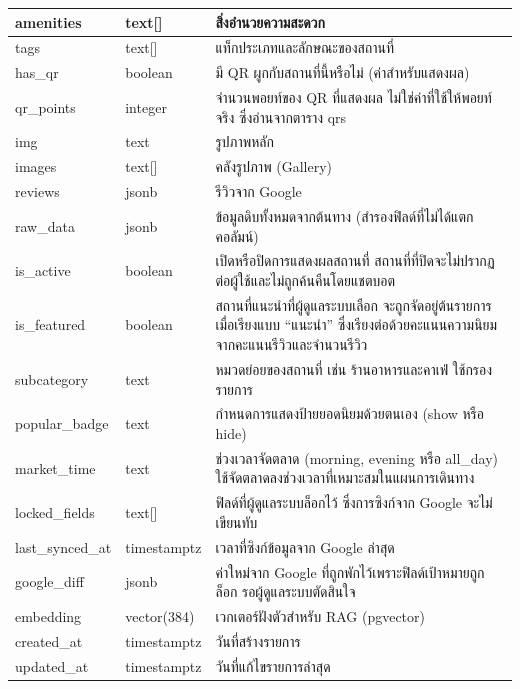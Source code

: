 {\begin{longtable}{|p{3.6cm}|p{2.6cm}|p{6.8cm}|}
amenities & text[] & สิ่งอำนวยความสะดวก \\ \hline
tags & text[] & แท็กประเภทและลักษณะของสถานที่ \\ \hline
has\_qr & boolean & มี QR ผูกกับสถานที่นี้หรือไม่ (ค่าสำหรับแสดงผล) \\ \hline
qr\_points & integer & จำนวนพอยท์ของ QR ที่แสดงผล ไม่ใช่ค่าที่ใช้ให้พอยท์จริง ซึ่งอ่านจากตาราง qrs \\ \hline
img & text & รูปภาพหลัก \\ \hline
images & text[] & คลังรูปภาพ (Gallery) \\ \hline
reviews & jsonb & รีวิวจาก Google \\ \hline
raw\_data & jsonb & ข้อมูลดิบทั้งหมดจากต้นทาง (สำรองฟิลด์ที่ไม่ได้แตกคอลัมน์) \\ \hline
is\_active & boolean & เปิดหรือปิดการแสดงผลสถานที่ สถานที่ที่ปิดจะไม่ปรากฏต่อผู้ใช้และไม่ถูกค้นคืนโดยแชตบอต \\ \hline
is\_featured & boolean & สถานที่แนะนำที่ผู้ดูแลระบบเลือก จะถูกจัดอยู่ต้นรายการเมื่อเรียงแบบ ``แนะนำ'' ซึ่งเรียงต่อด้วยคะแนนความนิยมจากคะแนนรีวิวและจำนวนรีวิว \\ \hline
subcategory & text & หมวดย่อยของสถานที่ เช่น ร้านอาหารและคาเฟ่ ใช้กรองรายการ \\ \hline
popular\_badge & text & กำหนดการแสดงป้ายยอดนิยมด้วยตนเอง (show หรือ hide) \\ \hline
market\_time & text & ช่วงเวลาจัดตลาด (morning, evening หรือ all\_day) ใช้จัดตลาดลงช่วงเวลาที่เหมาะสมในแผนการเดินทาง \\ \hline
locked\_fields & text[] & ฟิลด์ที่ผู้ดูแลระบบล็อกไว้ ซึ่งการซิงก์จาก Google จะไม่เขียนทับ \\ \hline
last\_synced\_at & timestamptz & เวลาที่ซิงก์ข้อมูลจาก Google ล่าสุด \\ \hline
google\_diff & jsonb & ค่าใหม่จาก Google ที่ถูกพักไว้เพราะฟิลด์เป้าหมายถูกล็อก รอผู้ดูแลระบบตัดสินใจ \\ \hline
embedding & vector(384) & เวกเตอร์ฝังตัวสำหรับ RAG (pgvector) \\ \hline
created\_at & timestamptz & วันที่สร้างรายการ \\ \hline
updated\_at & timestamptz & วันที่แก้ไขรายการล่าสุด \\
\hline
\end{longtable}
\par}


